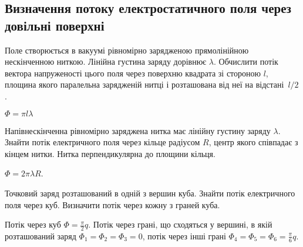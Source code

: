
\subsection*{Визначення потоку електростатичного поля через довільні поверхні}

\begin{problem}
Поле створюється в вакуумі рівномірно зарядженою прямолінійною нескінченною ниткою. Лінійна густина заряду дорівнює $\lambda$. Обчислити потік вектора напруженості цього поля через поверхню квадрата зі стороною $l$, площина якого паралельна зарядженій нитці і розташована від неї на відстані~$l/2$.
\begin{solution}
	$\Phi = \pi l \lambda$
\end{solution}
\end{problem}

\begin{problem}
Напівнескінченна рівномірно заряджена нитка має лінійну густину заряду $\lambda$. Знайти потік електричного поля через кільце радіусом $R$, центр якого співпадає з кінцем нитки. Нитка перпендикулярна до площини кільця.
\begin{solution}
	$\Phi = 2\pi\lambda R$.
\end{solution}
\end{problem}

\begin{problem}
Точковий заряд розташований в одній з вершин куба. Знайти потік електричного поля через куб. Визначити потік через кожну з граней куба.
\begin{solution}
	Потік через куб $\Phi = \frac{\pi}{2}q$. Потік через грані, що сходяться у вершині, в якій розташований заряд $\Phi_1 = \Phi_2 =\Phi_3 = 0$, потік через інші грані $\Phi_4 = \Phi_5 =\Phi_6 = \frac{\pi}{6}q$.
\end{solution}
\end{problem}

